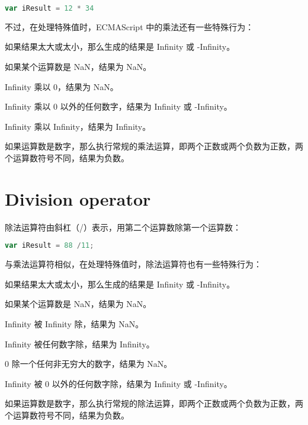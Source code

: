 \begin{lstlisting}[language=JavaScript]
var iResult = 12 * 34
\end{lstlisting}

不过，在处理特殊值时，ECMAScript 中的乘法还有一些特殊行为：


\begin{compactitem}
\item 如果结果太大或太小，那么生成的结果是 Infinity 或 -Infinity。
\item 如果某个运算数是 NaN，结果为 NaN。
\item Infinity 乘以 0，结果为 NaN。
\item Infinity 乘以 0 以外的任何数字，结果为 Infinity 或 -Infinity。
\item Infinity 乘以 Infinity，结果为 Infinity。
\end{compactitem}


如果运算数是数字，那么执行常规的乘法运算，即两个正数或两个负数为正数，两个运算数符号不同，结果为负数。



\section{Division operator}

除法运算符由斜杠（/）表示，用第二个运算数除第一个运算数：

\begin{lstlisting}[language=JavaScript]
var iResult = 88 /11;
\end{lstlisting}

与乘法运算符相似，在处理特殊值时，除法运算符也有一些特殊行为：

\begin{compactitem}
\item 如果结果太大或太小，那么生成的结果是 Infinity 或 -Infinity。
\item 如果某个运算数是 NaN，结果为 NaN。
\item Infinity 被 Infinity 除，结果为 NaN。
\item Infinity 被任何数字除，结果为 Infinity。
\item 0 除一个任何非无穷大的数字，结果为 NaN。
\item Infinity 被 0 以外的任何数字除，结果为 Infinity 或 -Infinity。
\end{compactitem}


如果运算数是数字，那么执行常规的除法运算，即两个正数或两个负数为正数，两个运算数符号不同，结果为负数。




